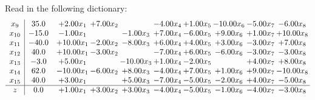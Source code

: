 \documentclass[9pt]{article}
\begin{document}
Read in the following dictionary:
\[\begin{array}{c| c c@{\hskip 2pt} c@{\hskip 2pt} c@{\hskip 2pt} c@{\hskip 2pt} c@{\hskip 2pt} c@{\hskip 2pt} c@{\hskip 2pt} c@{\hskip 2pt} }
 x_{9}   &  35.0 & +  2.00 x_{1} & +  7.00 x_{2} &   & -4.00 x_{4} & +  1.00 x_{5} & -10.00 x_{6} & -5.00 x_{7} & -6.00 x_{8}\\
 x_{10}   &  -15.0 & -1.00 x_{1} &   & -1.00 x_{3} & +  7.00 x_{4} & -6.00 x_{5} & +  9.00 x_{6} & +  1.00 x_{7} & + 10.00 x_{8}\\
 x_{11}   &  -40.0 & + 10.00 x_{1} & -2.00 x_{2} & -8.00 x_{3} & +  6.00 x_{4} & +  4.00 x_{5} & +  3.00 x_{6} & -3.00 x_{7} & +  7.00 x_{8}\\
 x_{12}   &  40.0 & + 10.00 x_{1} & -3.00 x_{2} &   & -7.00 x_{4} & +  6.00 x_{5} & -6.00 x_{6} & -3.00 x_{7} & -3.00 x_{8}\\
 x_{13}   &  -3.0 & +  5.00 x_{1} &   & -10.00 x_{3} & +  1.00 x_{4} & -2.00 x_{5} &   & +  4.00 x_{7} & +  8.00 x_{8}\\
 x_{14}   &  62.0 & -10.00 x_{1} & -6.00 x_{2} & +  8.00 x_{3} & -4.00 x_{4} & +  7.00 x_{5} & +  1.00 x_{6} & +  9.00 x_{7} & -10.00 x_{8}\\
 x_{15}   &  40.0 & +  3.00 x_{1} &   & +  5.00 x_{3} & -7.00 x_{4} & -5.00 x_{5} & -2.00 x_{6} & +  4.00 x_{7} & -5.00 x_{8}\\
\hline
z    &  0.0 & +  1.00 x_{1} & +  3.00 x_{2} & +  3.00 x_{3} & -4.00 x_{4} & -5.00 x_{5} & -1.00 x_{6} & -4.00 x_{7} & -3.00 x_{8}\\
\end{array}\]
\end{document}
